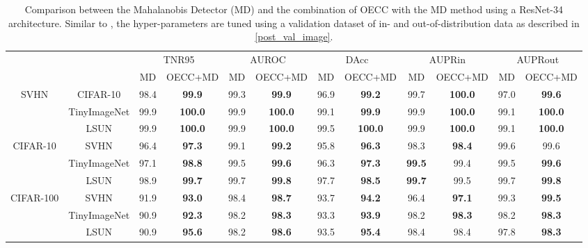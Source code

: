 \documentclass{article} \usepackage{iclr2020_conference,times}
\begin{document}
\begin{table*}[h]
\begin{adjustbox}{max width=\textwidth}
\begin{tabular}{cc|cc|cc|cc|cc|cc}
\multicolumn{2}{c}{}&\multicolumn{2}{c}{TNR95}&\multicolumn{2}{c}{AUROC}&\multicolumn{2}{c}{DAcc}&\multicolumn{2}{c}{AUPRin}&\multicolumn{2}{c}{AUPRout}\\
\cline{3-12} 
&&MD&OECC+MD&MD&OECC+MD&MD&OECC+MD&MD&OECC+MD&MD&OECC+MD\\
\hline
\multirow{3}{*}{{{SVHN}}}&CIFAR-10&98.4&\textbf{99.9}&99.3&\textbf{99.9}&96.9&\textbf{99.2}&99.7&\textbf{100.0}&97.0&\textbf{99.6}\\
&TinyImageNet&99.9&\textbf{100.0}&99.9&\textbf{100.0}&99.1&\textbf{99.9}&99.9&\textbf{100.0}&99.1&\textbf{100.0}\\
&LSUN&99.9&\textbf{100.0}&99.9&\textbf{100.0}&99.5&\textbf{100.0}&99.9&\textbf{100.0}&99.1&\textbf{100.0}\\
\hline
\multirow{3}{*}{{{CIFAR-10}}}&SVHN&96.4&\textbf{97.3}&99.1&\textbf{99.2}&95.8&\textbf{96.3}&98.3&\textbf{98.4}&99.6&99.6\\
&TinyImageNet&97.1&\textbf{98.8}&99.5&\textbf{99.6}&96.3&\textbf{97.3}&\textbf{99.5}&99.4&99.5&\textbf{99.6}\\
&LSUN&98.9&\textbf{99.7}&99.7&\textbf{99.8}&97.7&\textbf{98.5}&\textbf{99.7}&99.5&99.7&\textbf{99.8}\\
\hline
\multirow{3}{*}{{{CIFAR-100}}}&SVHN&91.9&\textbf{93.0}&98.4&\textbf{98.7}&93.7&\textbf{94.2}&96.4&\textbf{97.1}&99.3&\textbf{99.5}\\
&TinyImageNet&90.9&\textbf{92.3}&98.2&\textbf{98.3}&93.3&\textbf{93.9}&98.2&\textbf{98.3}&98.2&\textbf{98.3}\\
&LSUN&90.9&\textbf{95.6}&98.2&\textbf{98.6}&93.5&\textbf{95.4}&98.4&98.4&97.8&\textbf{98.3}\\
\hline
\end{tabular}
\end{adjustbox}
\caption{\label{Mahalanobis}Comparison between the Mahalanobis Detector (MD) \citep{Lee:2018:SUF:3327757.3327819} and the combination of OECC with the MD method using a ResNet-34 architecture. Similar to \cite{Lee:2018:SUF:3327757.3327819}, the hyper-parameters are tuned using a validation dataset of in- and out-of-distribution data as described in \ref{post_val_image}.}
\end{table*}
\end{document}
